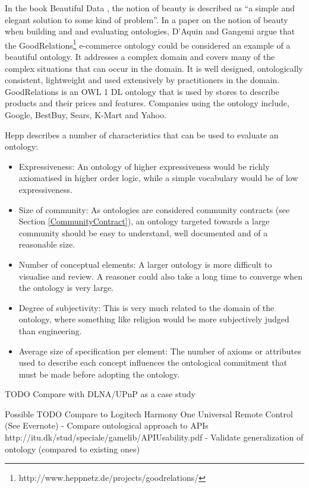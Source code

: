 In the book Beautiful Data \cite{Segaran2009}, the notion of beauty is described as ``a simple and elegant solution to some kind of problem''. In a paper on the notion of beauty when building and and evaluating ontologies, D'Aquin and Gangemi \cite{DAquin2011} argue that the GoodRelations\footnote{http://www.heppnetz.de/projects/goodrelations/} e-commerce ontology could be considered an example of a beautiful ontology. It addresses a complex domain and covers many of the complex situations that can occur in the domain. It is well designed, ontologically consistent, lightweight and used extensively by practitioners in the domain. GoodRelations is an OWL 1 DL ontology that is used by stores to describe products and their prices and features. Companies using the ontology include, Google, BestBuy, Sears, K-Mart and Yahoo.

Hepp \cite{Hepp2007} describes a number of characteristics that can be used to evaluate an ontology:

\begin{itemize}
	\item Expressiveness: An ontology of higher expressiveness would be richly axiomatised in higher order logic, while a simple vocabulary would be of low expressiveness.
	\item Size of community: As ontologies are considered community contracts (see Section \ref{CommunityContract}), an ontology targeted towards a large community should be easy to understand, well documented and of a reasonable size.
	\item Number of conceptual elements: A larger ontology is more difficult to visualise and review. A reasoner could also take a long time to converge when the ontology is very large.
	\item Degree of subjectivity: This is very much related to the domain of the ontology, where something like religion would be more subjectively judged than engineering.
	\item Average size of specification per element: The number of axioms or attributes used to describe each concept influences the ontological commitment\label{OntologicalCommitment} that must be made before adopting the ontology. 
\end{itemize}








TODO Compare with DLNA/UPnP as a case study

Possible TODO
Compare to Logitech Harmony One Universal Remote Control (See Evernote)
- Compare ontological approach to APIs http://itu.dk/stud/speciale/gamelib/APIUsability.pdf
- Validate generalization of ontology (compared to existing ones)